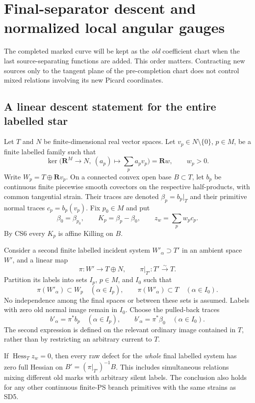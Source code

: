 \section{Final-separator descent and normalized local angular gauges}
\label{sec:r13-final-separator-raw-descent}

The completed marked curve will be kept as the \emph{old} coefficient
chart when the last source-separating functions are added.  This order
matters.  Contracting new sources only to the tangent plane of the
pre-completion chart does not control mixed relations involving its
new Picard coordinates.

\subsection{A linear descent statement for the entire labelled star}

Let $T$ and $N$ be finite-dimensional real vector spaces.  Let
$v_p\in N\setminus\{0\}$, $p\in M$, be a finite labelled family
such that
\[
 \ker\bigl(\mathbf R^M\longrightarrow N,\ (a_p)\longmapsto
                    \sum_pa_pv_p\bigr)=\mathbf Rw,
       \qquad w_p>0.
 \tag{SD1}
\]
Write $W_p=T\oplus\mathbf Rv_p$.  On a connected convex open
base $B\subset T$, let $b_p$ be continuous finite piecewise smooth
covectors on the respective half-products, with common tangential
strain.  Their traces are denoted $\beta_p=b_p|_T$ and their
primitive normal traces $c_p=b_p(v_p)$.  Fix $p_0\in M$ and put
\[
 \beta_0=\beta_{p_0},\qquad
 K_p=\beta_p-\beta_0,\qquad z_w=\sum_pw_pc_p.
 \tag{SD2}
\]
By CS6 every $K_p$ is affine Killing on $B$.

Consider a second finite labelled incident system
$W'_\alpha\supset T'$ in an ambient space $W'$, and a linear
map
\[
 \pi:W'\longrightarrow T\oplus N,
                    \qquad \pi|_{T'}:T'\xrightarrow{\sim}T.
 \tag{SD3}
\]
Partition its labels into sets $I_p$, $p\in M$, and $I_0$ such
that
\[
 \pi(W'_\alpha)\subset W_p\quad(\alpha\in I_p),
   \qquad \pi(W'_\alpha)\subset T\quad(\alpha\in I_0).
 \tag{SD4}
\]
No independence among the final spaces or between these sets is
assumed.  Labels with zero old normal image remain in $I_0$.
Choose the pulled-back traces
\[
 b'_\alpha=\pi^*b_p\quad(\alpha\in I_p),\qquad
 b'_\alpha=\pi^*\beta_0\quad(\alpha\in I_0).
 \tag{SD5}
\]
The second expression is defined on the relevant ordinary image
contained in $T$, rather than by restricting an arbitrary current
to $T$.

\begin{theorem}
\label{thm:r13-sd-mixed-raw-hessian}
If $\operatorname{Hess}_Tz_w=0$, then every raw defect for the
\emph{whole} final labelled system has zero full Hessian on
$B'=(\pi|_{T'})^{-1}B$.  This includes simultaneous relations
mixing different old marks with arbitrary silent labels.
The conclusion also holds for any other continuous finite-PS
branch primitives with the same strains as SD5.
\end{theorem}

